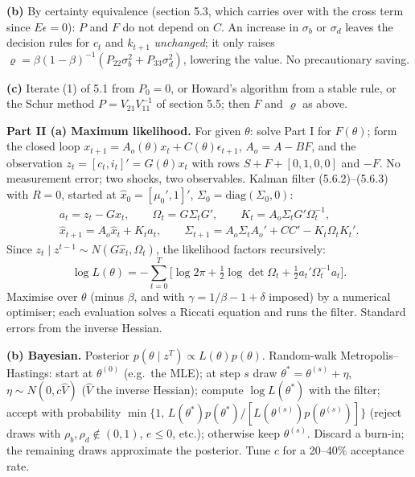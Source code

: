 \documentclass[12pt, letterpaper]{article}
\begin{document}
\begin{tcolorbox}[oddbox,title={Exercise 5.9 \quad A permanent-income planner and its likelihood}]
\textbf{(b)} By certainty equivalence (section 5.3, which carries over with the cross term since
$E\epsilon=0$): $P$ and $F$ do not depend on $C$. An increase in $\sigma_b$ or $\sigma_d$ leaves the
decision rules for $c_t$ and $k_{t+1}$ \emph{unchanged}; it only raises
$\varrho=\beta(1-\beta)^{-1}(P_{22}\sigma_b^2+P_{33}\sigma_d^2)$, lowering the value. No precautionary
saving.

\textbf{(c)} Iterate (1) of 5.1 from $P_0=0$, or Howard's algorithm from a stable rule, or the Schur
method $P=V_{21}V_{11}^{-1}$ of section 5.5; then $F$ and $\varrho$ as above.

\textbf{Part II (a) Maximum likelihood.} For given $\theta$: solve Part I for $F(\theta)$; form the
closed loop $x_{t+1}=A_o(\theta)x_t+C(\theta)\epsilon_{t+1}$, $A_o=A-BF$, and the observation
$z_t=[c_t,i_t]'=G(\theta)x_t$ with rows $S+F+[0,1,0,0]$ and $-F$. No measurement error; two shocks,
two observables. Kalman filter (5.6.2)--(5.6.3) with $R=0$, started at $\hat x_0=[\mu_0',1]'$,
$\Sigma_0=\mathrm{diag}(\Sigma_0,0)$:
\begin{gather*}
a_t=z_t-G\hat x_t,\qquad \Omega_t=G\Sigma_tG',\qquad K_t=A_o\Sigma_tG'\Omega_t^{-1},\\
\hat x_{t+1}=A_o\hat x_t+K_ta_t,\qquad \Sigma_{t+1}=A_o\Sigma_tA_o'+CC'-K_t\Omega_tK_t'.
\end{gather*}
Since $z_t\mid z^{t-1}\sim N(G\hat x_t,\Omega_t)$, the likelihood factors recursively:
\[
\log L(\theta)=-\sum_{t=0}^T\Big[\log2\pi+\tfrac12\log\det\Omega_t+\tfrac12a_t'\Omega_t^{-1}a_t\Big].
\]
Maximise over $\theta$ (minus $\beta$, and with $\gamma=1/\beta-1+\delta$ imposed) by a numerical
optimiser; each evaluation solves a Riccati equation and runs the filter. Standard errors from the
inverse Hessian.

\textbf{(b) Bayesian.} Posterior $p(\theta\mid z^T)\propto L(\theta)p(\theta)$. Random-walk
Metropolis--Hastings: start at $\theta^{(0)}$ (e.g.\ the MLE); at step $s$ draw
$\theta^*=\theta^{(s)}+\eta$, $\eta\sim N(0,c\hat V)$ ($\hat V$ the inverse Hessian); compute
$\log L(\theta^*)$ with the filter; accept with probability
$\min\{1,\,L(\theta^*)p(\theta^*)/[L(\theta^{(s)})p(\theta^{(s)})]\}$ (reject draws with
$\rho_b,\rho_d\notin(0,1)$, $e\le0$, etc.); otherwise keep $\theta^{(s)}$. Discard a burn-in; the
remaining draws approximate the posterior. Tune $c$ for a 20--40\% acceptance rate.


\end{tcolorbox}
\end{document}
